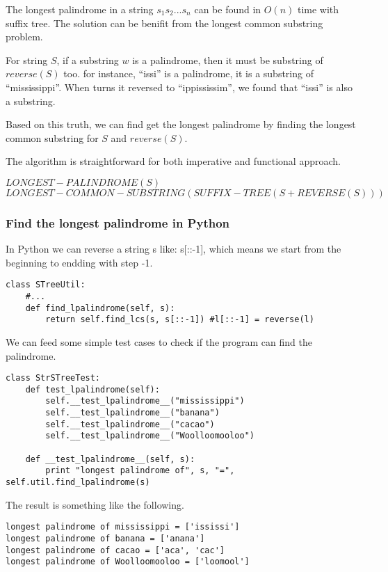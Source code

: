 \documentclass{article}
\begin{document}
The longest palindrome in a string $s_1s_2...s_n$ can be found in 
$O(n)$ time with suffix tree. The solution can be benifit from the 
longest common substring problem.

For string $S$, if a substring $w$ is a palindrome, then it must be
substring of $reverse(S)$ too. for instance, ``issi'' is a palindrome,
it is a substring of ``mississippi''. When turns it reversed to
``ippississim'', we found that ``issi'' is also a substring.

Based on this truth, we can find get the longest palindrome by
finding the longest common substring for $S$ and $reverse(S)$.

The algorithm is straightforward for both imperative and functional
approach.

\begin{algorithmic}
\STATE $LONGEST-PALINDROME(S)$
  \RETURN $LONGEST-COMMON-SUBSTRING(SUFFIX-TREE(S+REVERSE(S)))$
\end{algorithmic}

\subsubsection*{Find the longest palindrome in Python}
In Python we can reverse a string s like: s[::-1], which means
we start from the beginning to endding with step -1.

\begin{lstlisting}
class STreeUtil:
    #...
    def find_lpalindrome(self, s):
        return self.find_lcs(s, s[::-1]) #l[::-1] = reverse(l)
\end{lstlisting}

We can feed some simple test cases to check if the program can
find the palindrome.

\begin{lstlisting}
class StrSTreeTest:
    def test_lpalindrome(self):
        self.__test_lpalindrome__("mississippi")
        self.__test_lpalindrome__("banana")
        self.__test_lpalindrome__("cacao")
        self.__test_lpalindrome__("Woolloomooloo")

    def __test_lpalindrome__(self, s):
        print "longest palindrome of", s, "=", self.util.find_lpalindrome(s)
\end{lstlisting}

The result is something like the following.

\begin{verbatim}
longest palindrome of mississippi = ['ississi']
longest palindrome of banana = ['anana']
longest palindrome of cacao = ['aca', 'cac']
longest palindrome of Woolloomooloo = ['loomool']
\end{verbatim}
\end{document}
